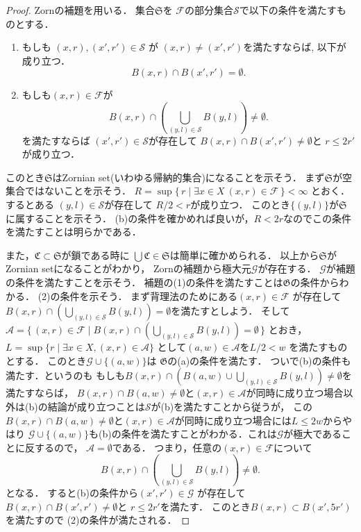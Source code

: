 \documentclass[leqno, a4paper, 12pt]{jsarticle}
\begin{document}
\begin{proof}
Zornの補題を用いる．
集合$\mathfrak{S}$を
$\mathcal{F}$の部分集合$\mathcal{S}$で以下の条件を満たすものとする．
\begin{enumerate}
\item[(a)] もしも $(x, r), (x', r')\in \mathcal{S}$ が
$(x, r)\neq (x', r')$を満たすならば, 以下が成り立つ．
\[
B(x, r)\cap B(x', r')=\emptyset. 
\]
\item[(b)] 
もしも$(x, r)\in \mathcal{F}$が
\[
B(x, r)\cap 
\left(\bigcup_{(y, l)\in \mathcal{S}}B(y, l)\right)
\neq \emptyset. 
\]
を満たすならば
$(x', r')\in \mathcal{S}$が存在して
$B(x, r)\cap B(x', r')\neq \emptyset$と
$r\le 2r'$が成り立つ．
\end{enumerate}
このとき$\mathfrak{S}$はZornian set(いわゆる帰納的集合)になることを示そう．
まず$\mathfrak{S}$が空集合ではないことを示そう．
$R=
\sup\{\,r\mid \exists x\in X\ (x, r)\in \mathcal{F} \, \}<\infty$
とおく．
するとある
$(y, l)\in \mathcal{S}$が存在して
$R/2<r$が成り立つ．
このとき$\{(y, l)\}$が$\mathfrak{S}$に属することを示そう．
(b)の条件を確かめれば良いが，$R< 2r$なのでこの条件を満たすことは明らかである．

また，$\mathfrak{C}\subset \mathfrak{S}$が鎖である時に
$\bigcup\mathfrak{C}\in \mathfrak{S}$は簡単に確かめられる．
以上から$\mathfrak{S}$がZornian setになることがわかり，
Zornの補題から極大元$\mathcal{G}$が存在する．
$\mathcal{G}$が補題の条件を満たすことを示そう．
補題の(1)の条件を満たすことは$\mathfrak{G}$の条件からわかる．
(2)の条件を示そう．
まず背理法のためにある$(x, r)\in \mathcal{F}$
が存在して$B(x, r)\cap 
\left(\bigcup_{(y, l)\in \mathcal{S}}B(y, l)\right)
= \emptyset$を満たすとしよう．
そして$\mathcal{A}=
\{\, 
(x, r)\in \mathcal{F}\mid 
B(x, r)\cap 
\left(\bigcup_{(y, l)\in \mathcal{S}}B(y, l)\right)
= \emptyset
\, \}$
とおき，
$L=\sup\{r\mid \exists x\in X, (x, r)\in \mathcal{A}\}$
として$(a, w)\in \mathcal{A}$を$L/2< w$
を満たすものとする．
このとき$\mathcal{G}\cup\{(a, w)\}$は
$\mathfrak{G}$の(a)の条件を満たす．
ついで(b)の条件も満たす．というのも
もしも$B(x, r)\cap \left(B(a, w)\cup \bigcup_{(y, l)\in \mathcal{S}}B(y, l)\right)\neq \emptyset
$を満たすならば，
$B(x, r)\cap B(a, w)\neq \emptyset$と$(x, r)\in \mathcal{A}$が同時に成り立つ場合以外は(b)の結論が成り立つことは$\mathcal{S}$が(b)を満たすことから従うが，
この$B(x, r)\cap B(a, w)\neq \emptyset$と$(x, r)\in \mathcal{A}$が同時に成り立つ場合には$L\le 2w$からやはり
$\mathcal{G}\cup\{(a, w)\}$も(b)の条件を満たすことがわかる．これは$\mathcal{G}$が極大であることに反するので，
$\mathcal{A}=\emptyset$である．
つまり，任意の$(x, r)\in \mathcal{F}$について
\[
B(x, r)\cap 
\left(\bigcup_{(y, l)\in \mathcal{S}}B(y, l)\right)
\neq \emptyset. 
\]
となる．
すると(b)の条件から$(x', r')\in \mathcal{G}$
が存在して
$B(x, r)\cap B(x', r')\neq \emptyset$と
$r\le 2r'$を満たす．
このとき$B(x, r)\subset B(x', 5r')$を満たすので
(2)の条件が満たされる．
\end{proof}
\end{document}
